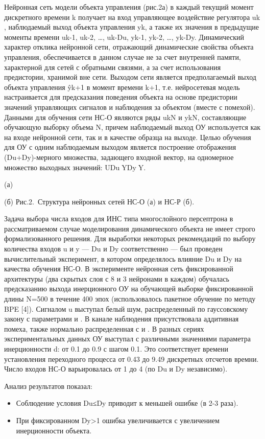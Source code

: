 Нейронная сеть модели объекта управления (рис.2а) в каждый текущий
момент дискретного времени k получает на вход управляющее воздействие
регулятора uk , наблюдаемый выход объекта управления yk, а также их
значения в предыдущие моменты времени uk-1, uk-2, …, uk-Du, yk-1,
yk-2, …, yk-Dy.  Динамический характер отклика нейронной сети,
отражающий динамические свойства объекта управления, обеспечивается в
данном случае не за счет внутренней памяти, характерной для сетей с
обратными связями, а за счет использования предистории, хранимой вне
сети.  Выходом сети является предполагаемый выход объекта управления
ŷk+1 в момент времени k+1, т.е. нейросетевая модель настраивается для
предсказания поведения объекта на основе предистории значений
управляющих сигналов и наблюдения за объектом (вместе с
помехой). Данными для обучения сети НС-О являются ряды {uk}N и {yk}N,
составляющие обучающую выборку объема N, причем наблюдаемый выход ОУ
используется как на входе нейронной сети, так и в качестве образца на
выходе.  Целью обучения для ОУ с одним наблюдаемым выходом является
построение отображения (Du+Dy)-мерного множества, задающего входной
вектор, на одномерное множество выходных значений: UDuYDyY.

(а)

(б)
Рис.2. Структура нейронных  сетей НС-О (а) и НС-Р (б).

Задача выбора числа входов для ИНС типа многослойного персептрона в
рассматриваемом случае моделирования динамического объекта не имеет
строго формализованного решения. Для выработки некоторых рекомендаций
по выбору количества входов u и y — Du и Dy соответственно — был
проведен вычислительный эксперимент, в котором определялось влияние Du
и Dy на качества обучения НС-О.  В эксперименте нейронная сеть
фиксированной архитектуры (два скрытых слоя с 8 и 3 нейронами в
каждом) обучалась предсказанию выхода инерционного ОУ на обучающей
выборке фиксированной длины N=500 в течение 400 эпох (использовалось
пакетное обучение по методу BPE [4]).  Сигналом u выступал белый шум,
распределенный по гауссовскому закону с параметрами и .  В канале
наблюдения присутствовала аддитивная помеха, также нормально
распределенная с и .  В разных сериях экспериментальных данных ОУ
выступал с различными значениями параметра инерционности d: от 0.1 до
0.9 с шагом 0.1.  Это соответствует времени установления переходного
процесса от 0.43 до 9.49 дискретных отсчетов времни.  Число входов
НС-О варьировалась от 1 до 4 (по Du и Dy независимо).

Анализ результатов показал:
\begin{itemize}
\item Соблюдение условия Du≤Dy приводит к меньшей ошибке (в 2-3 раза).
\item При фиксированном Dy>1 ошибка увеличивается с увеличением инерционности объекта.
\end{itemize}

